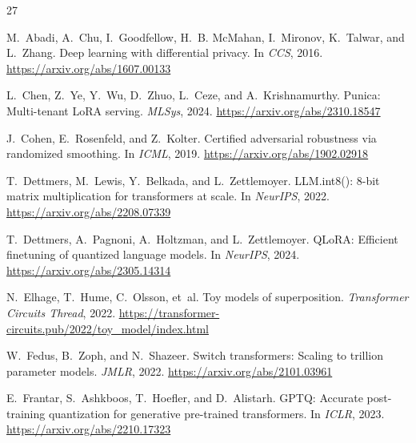 \documentclass[11pt,a4paper]{article}
\begin{document}


\begin{thebibliography}{27}

M.~Abadi, A.~Chu, I.~Goodfellow, H.~B. McMahan, I.~Mironov, K.~Talwar, and
  L.~Zhang.
\newblock Deep learning with differential privacy.
\newblock In \emph{CCS}, 2016.
\newblock \url{https://arxiv.org/abs/1607.00133}

L.~Chen, Z.~Ye, Y.~Wu, D.~Zhuo, L.~Ceze, and A.~Krishnamurthy.
\newblock Punica: Multi-tenant LoRA serving.
\newblock \emph{MLSys}, 2024.
\newblock \url{https://arxiv.org/abs/2310.18547}

J.~Cohen, E.~Rosenfeld, and Z.~Kolter.
\newblock Certified adversarial robustness via randomized smoothing.
\newblock In \emph{ICML}, 2019.
\newblock \url{https://arxiv.org/abs/1902.02918}

T.~Dettmers, M.~Lewis, Y.~Belkada, and L.~Zettlemoyer.
\newblock LLM.int8(): 8-bit matrix multiplication for transformers at scale.
\newblock In \emph{NeurIPS}, 2022.
\newblock \url{https://arxiv.org/abs/2208.07339}

T.~Dettmers, A.~Pagnoni, A.~Holtzman, and L.~Zettlemoyer.
\newblock QLoRA: Efficient finetuning of quantized language models.
\newblock In \emph{NeurIPS}, 2024.
\newblock \url{https://arxiv.org/abs/2305.14314}

N.~Elhage, T.~Hume, C.~Olsson, et~al.
\newblock Toy models of superposition.
\newblock \emph{Transformer Circuits Thread}, 2022.
\newblock \url{https://transformer-circuits.pub/2022/toy_model/index.html}

W.~Fedus, B.~Zoph, and N.~Shazeer.
\newblock Switch transformers: Scaling to trillion parameter models.
\newblock \emph{JMLR}, 2022.
\newblock \url{https://arxiv.org/abs/2101.03961}

E.~Frantar, S.~Ashkboos, T.~Hoefler, and D.~Alistarh.
\newblock GPTQ: Accurate post-training quantization for generative
  pre-trained transformers.
\newblock In \emph{ICLR}, 2023.
\newblock \url{https://arxiv.org/abs/2210.17323}


\end{thebibliography}
\end{document}
